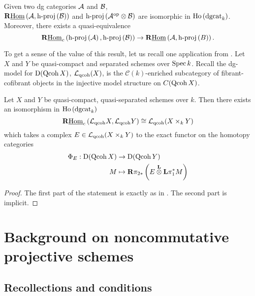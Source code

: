 \documentclass[dissertation.tex]{subfiles}
\begin{document}
\begin{corollary} \label{corollary: Toen}
  Given two dg categories \(\mathcal{A}\) and \(\mathcal{B}\), \\\(\mathbf{R}\underline{\operatorname{Hom}}\left(\mathcal{A}, \operatorname{h-proj}\left(\mathcal{B}\right)\right)\) and \(\operatorname{h-proj}\left(\mathcal{A}^{\operatorname{op}} \otimes \mathcal{B}\right)\) are isomorphic in \(\operatorname{Ho}\left(\operatorname{dgcat}_k\right)\).
  Moreover, there exists a quasi-equivalence
  \[\mathbf{R}\underline{\operatorname{Hom}}_c\left(\operatorname{h-proj}\left(\mathcal{A}\right),\operatorname{h-proj}\left(\mathcal{B}\right)\right) \to \mathbf{R}\underline{\operatorname{Hom}}\left(\mathcal{A}, \operatorname{h-proj}\left(B\right)\right).\]
\end{corollary}

To get a sense of the value of this result, let us recall one application from \cite[Section 8.3]{Toen}. Let \(X\) and \(Y\) be quasi-compact and separated schemes over \(\operatorname{Spec} k\). 
Recall the dg-model for \(\mathrm{D}(\operatorname{Qcoh} X)\), \(\mathcal L_{\operatorname{qcoh}}(X)\), is the \(\mathcal C(k)\)-enriched subcategory of fibrant-cofibrant objects in the injective model structure on \(C(\operatorname{Qcoh} X)\).

\begin{theorem}
  Let \(X\) and \(Y\) be quasi-compact, quasi-separated schemes over \(k\). Then there exists an isomorphism in \(\operatorname{Ho}\left(\operatorname{dgcat}_k\right)\)
  \begin{displaymath}
    \mathbf{R}\underline{\operatorname{Hom}}_c\left(\mathcal L_{\operatorname{qcoh}} X,\mathcal L_{\operatorname{qcoh}} Y\right) \cong \mathcal L_{\operatorname{qcoh}} (X \times_k Y)
  \end{displaymath}
  which takes a complex \(E \in \mathcal L_{\operatorname{qcoh}} (X \times_k Y)\) to the exact functor on the homotopy categories
  \begin{align*}
    \Phi_E : \mathrm{D}(\operatorname{Qcoh}X) & \to \mathrm{D}(\operatorname{Qcoh}Y) \\
    M & \mapsto \mathbf{R}\pi_{2 \ast} \left( E \overset{\mathbf{L}}{\otimes} \mathbf{L}\pi_1^\ast M \right)
  \end{align*}
\end{theorem}

\begin{proof}
  The first part of the statement is exactly as in \cite{Toen}. The second part is implicit. 
\end{proof}



\section{Background on noncommutative projective schemes} \label{section: background on NCP}

\subsection{Recollections and conditions} \label{subsection: standard results and conditions}
\end{document}
